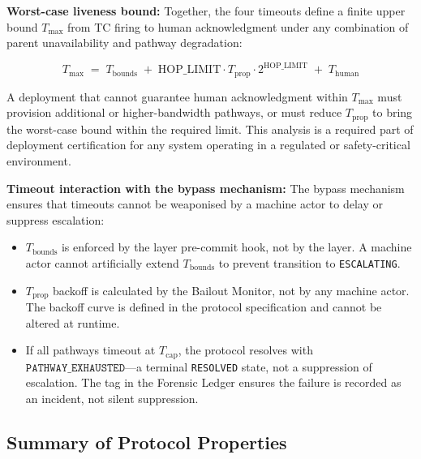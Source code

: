 \bigskip
\noindent\textbf{Worst-case liveness bound:} Together, the four timeouts define
a finite upper bound $T_{\max}$ from TC firing to human acknowledgment under
any combination of parent unavailability and pathway degradation:

\begin{equation}
T_{\max} \;=\; T_{\text{bounds}}
\;+\; \text{HOP\_LIMIT} \cdot T_{\text{prop}} \cdot 2^{\text{HOP\_LIMIT}}
\;+\; T_{\text{human}}
\tag{eq:tmax}
\end{equation}

A deployment that cannot guarantee human acknowledgment within $T_{\max}$ must
provision additional or higher-bandwidth pathways, or must reduce
$T_{\text{prop}}$ to bring the worst-case bound within the required limit.
This analysis is a required part of deployment certification for any \bxthree{}
system operating in a regulated or safety-critical environment.

\bigskip
\noindent\textbf{Timeout interaction with the bypass mechanism:} The bypass
mechanism ensures that timeouts cannot be weaponised by a machine actor to
delay or suppress escalation:

\begin{itemize}\itemsep=0pt
\item $T_{\text{bounds}}$ is enforced by the \fact{} layer pre-commit hook,
  not by the \bounds{} layer. A machine actor cannot artificially extend
  $T_{\text{bounds}}$ to prevent transition to \texttt{ESCALATING}.
\item $T_{\text{prop}}$ backoff is calculated by the Bailout Monitor, not
  by any machine actor. The backoff curve is defined in the protocol
  specification and cannot be altered at runtime.
\item If all pathways timeout at $T_{\text{cap}}$, the protocol resolves with
  $\texttt{PATHWAY\_EXHAUSTED}$—a terminal \texttt{RESOLVED} state, not a
  suppression of escalation. The tag in the Forensic Ledger ensures the
  failure is recorded as an incident, not silent suppression.
\end{itemize}


\subsection{Summary of Protocol Properties}\label{sec:bailout-summary}

